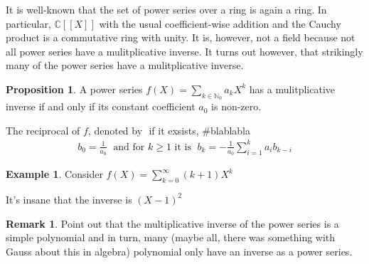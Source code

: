 \documentclass[a4paper]{article}
\theoremstyle{definition}
\newtheorem{example}{Example}[definition]
\newtheorem{proposition}[definition]{Proposition}
\newtheorem*{remark}{Remark}
\begin{document}
\vspace*{1cm}
It is well-known that the set of power series over a ring is again a ring. In particular, \(\mathbb{C}[[X]]\) with the usual coefficient-wise addition and the Cauchy product is a commutative ring with unity. It is, however, not a field because not all power series have a mulitplicative inverse. It turns out however, that strikingly many of the power series have a mulitplicative inverse.
%
\begin{proposition}
    A power series \(f(X) = \sum_{k \in \mathbb{N}_0} a_k X^k\) has a mulitplicative inverse if and only if its constant coefficient \(a_0\) is non-zero.

    The reciprocal of \(f\), denoted by \(\) if it exsists, \#blablabla
    \begin{align*}
        b_0 = \frac{1}{a_0} \; \text{ and for \(k \geq 1\) it is } \; b_k = -\frac{1}{a_0} \sum_{i = 1}^{k} a_i b_{k-i}
    \end{align*}
\end{proposition}
%
\begin{example}
    Consider \(f(X) = \sum_{k=0}^\infty (k+1) X^k\)

    It's insane that the inverse is \((X - 1)^2\)
\end{example}
%
\begin{remark}
    Point out that the multiplicative inverse of the power series is a simple polynomial and in turn, many (maybe all, there was something with Gauss about this in algebra) polynomial only have an inverse as a power series. 
\end{remark}
%
\end{document}
